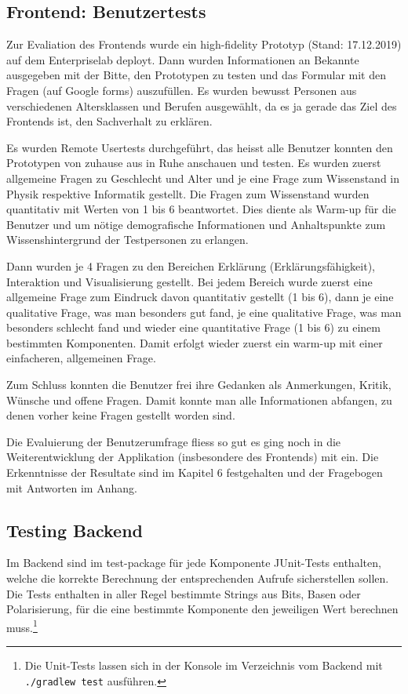 \documentclass[a4paper,10.2pt,pdftex]{scrartcl}%
\begin{document}
\subsection{Frontend: Benutzertests}
Zur Evaliation des Frontends wurde ein high-fidelity Prototyp (Stand: 17.12.2019) auf dem Enterpriselab deployt. Dann wurden Informationen an Bekannte ausgegeben mit der Bitte, den Prototypen zu testen und das Formular mit den Fragen (auf Google forms) auszufüllen. Es wurden bewusst Personen aus verschiedenen Altersklassen und Berufen ausgewählt, da es ja gerade das Ziel des Frontends ist, den Sachverhalt zu erklären.

Es wurden Remote Usertests durchgeführt, das heisst alle Benutzer konnten den Prototypen von zuhause aus in Ruhe anschauen und testen. Es wurden zuerst allgemeine Fragen zu Geschlecht und Alter und je eine Frage zum Wissenstand in Physik respektive Informatik gestellt. Die Fragen zum Wissenstand wurden quantitativ  mit Werten von 1 bis 6 beantwortet. Dies diente als Warm-up für die Benutzer und um nötige demografische Informationen und Anhaltspunkte zum Wissenshintergrund der Testpersonen zu erlangen.

Dann wurden je 4 Fragen zu den Bereichen Erklärung (Erklärungsfähigkeit), Interaktion und Visualisierung gestellt. Bei jedem Bereich wurde zuerst eine allgemeine Frage zum Eindruck davon quantitativ gestellt (1 bis 6), dann je eine qualitative Frage, was man besonders gut fand, je eine qualitative Frage, was man besonders schlecht fand und wieder eine quantitative Frage (1 bis 6) zu einem bestimmten Komponenten. Damit erfolgt wieder zuerst ein warm-up mit einer einfacheren, allgemeinen Frage.

Zum Schluss konnten die Benutzer frei ihre Gedanken als Anmerkungen, Kritik, Wünsche und offene Fragen. Damit konnte man alle Informationen abfangen, zu denen vorher keine Fragen gestellt worden sind.

Die Evaluierung der Benutzerumfrage fliess so gut es ging noch in die Weiterentwicklung der Applikation (insbesondere des Frontends) mit ein. Die Erkenntnisse der Resultate sind im Kapitel 6 festgehalten und der Fragebogen mit Antworten im Anhang.

\subsection{Testing Backend}
Im Backend sind im test-package für jede Komponente JUnit-Tests enthalten, welche die korrekte Berechnung der entsprechenden Aufrufe sicherstellen sollen. Die Tests enthalten in aller Regel bestimmte Strings aus Bits, Basen oder Polarisierung, für die eine bestimmte Komponente den jeweiligen Wert berechnen muss.\footnote{Die Unit-Tests lassen sich in der Konsole im Verzeichnis vom Backend mit \\ \texttt{./gradlew test} ausführen.}
\end{document}
